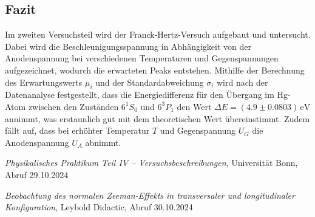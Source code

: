 \documentclass{article}
\begin{document}
\begin{multicols}{2}
\section{Fazit}

Im zweiten Versuchsteil wird der Franck-Hertz-Versuch aufgebaut und untersucht. Dabei 
wird die Beschleunigungsspannung in Abhängigkeit von der Anodenspannung bei verschiedenen 
Temperaturen und Gegenspannungen aufgezeichnet, wodurch die erwarteten Peaks entstehen. 
Mithilfe der Berechnung des Erwartungswerts $\mu_i$ und der Standardabweichung $\sigma_i$ 
wird nach der Datenanalyse festgestellt, dass die Energiedifferenz für den Übergang im 
Hg-Atom zwischen den Zuständen $6^1S_0$ und $6^3P_1$ den Wert $\Delta E = (4.9 \pm 0.0803) \, 
\text{eV}$ annimmt, was erstaunlich gut mit dem theoretischen Wert übereinstimmt. Zudem 
fällt auf, dass bei erhöhter Temperatur $T$ und Gegenspannung $U_G$ die Anodenspannung $U_A$ abnimmt.



\clearpage
\begin{thebibliography}{9}

\textit{Physikalisches Praktikum Teil IV -- Versuchsbeschreibungen}, Universität Bonn, Abruf 29.10.2024

\textit{Beobachtung des normalen Zeeman-Effekts in transversaler und longitudinaler Konfiguration}, Leybold Didactic, Abruf 30.10.2024

\end{thebibliography}
\clearpage

\end{multicols}
\end{document}
